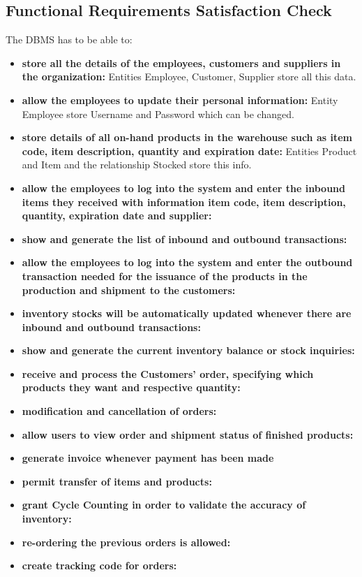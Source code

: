 \subsection{Functional Requirements Satisfaction Check}

The DBMS has to be able to:
\begin{itemize}
	\item \textbf{store all the details of the employees, customers and suppliers in the organization:} Entities Employee, Customer, Supplier store all this data.
	\item \textbf{allow the employees to update their personal information:} Entity Employee store Username and Password which can be changed.
	\item \textbf{store details of all on-hand products in the warehouse such as item code, item description, quantity and expiration date:} Entities Product and Item and the relationship Stocked store this info. 
	\item \textbf{allow the employees to log into the system and enter the inbound items they received with information item code, item description, quantity, expiration date and supplier:}
	\item \textbf{show and generate the list of inbound and outbound transactions:}
	\item \textbf{allow the employees to log into the system and enter the outbound transaction needed for the issuance of the products in the production and shipment to the customers:}
    \item \textbf{inventory stocks will be automatically updated whenever there are inbound and outbound transactions:}
    \item \textbf{show and generate the current inventory balance or stock inquiries:}
    \item \textbf{receive and process the Customers’ order, specifying which products they want and respective quantity:}
    \item \textbf{modification and cancellation of orders:}
    \item \textbf{allow users to view order and shipment status of finished products:}
    \item \textbf{generate invoice whenever payment has been made}
    \item \textbf{permit transfer of items and products:}
    \item \textbf{grant Cycle Counting in order to validate the accuracy of inventory:}
    \item \textbf{re-ordering the previous orders is allowed:}
    \item \textbf{create tracking code for orders:}
\end{itemize}




